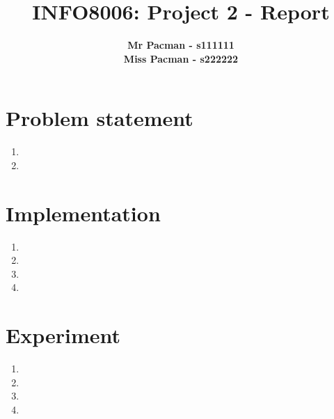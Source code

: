 \documentclass{article}
\begin{document}

\title{\Large{INFO8006: Project 2 - Report}}
\vspace{1cm}
\author{\small{\bf Mr Pacman - s111111} \\ \small{\bf Miss Pacman - s222222}}

\maketitle


\section{Problem statement}

\begin{enumerate}[label=\alph*.]
    	\item
	\item
\end{enumerate}

\section{Implementation}

\begin{enumerate}[label=\alph*.]
	\item
   	\item
    	\item
    	\item
\end{enumerate}

\section{Experiment}

\begin{enumerate}[label=\alph*.]
    \item
    \item
    \item
    \item
\end{enumerate}



\end{document}
